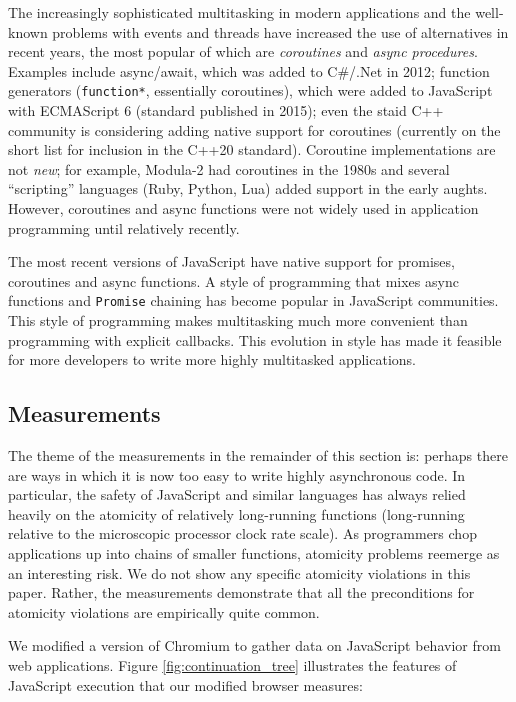\documentclass[acmsmall,anonymous,review]{acmart}\settopmatter{printfolios=true,printccs=false,printacmref=false}
\begin{document}
The increasingly sophisticated multitasking in modern applications and the well-known problems with events and threads have increased the use of alternatives in recent years, the most popular of which are \emph{coroutines} and \emph{async procedures}.
Examples include async/await, which was added to C\#/.Net in 2012; function generators (\texttt{function*}, essentially coroutines), which were added to JavaScript with ECMAScript 6 (standard published in 2015); even the staid C++ community is considering adding native support for coroutines (currently on the short list for inclusion in the C++20 standard).
Coroutine implementations are not \emph{new}; for example, Modula-2 had coroutines in the 1980s and several ``scripting'' languages (Ruby, Python, Lua) added support in the early aughts.
However, coroutines and async functions were not widely used in application programming until relatively recently.

The most recent versions of JavaScript have native support for promises, coroutines and async functions.
A style of programming that mixes async functions and \texttt{Promise} chaining has become popular in JavaScript communities.
This style of programming makes multitasking much more convenient than programming with explicit callbacks.
This evolution in style has made it feasible for more developers to write more highly multitasked applications.

\subsection{Measurements}

The theme of the measurements in the remainder of this section is: perhaps there are ways in which it is now too easy to write highly asynchronous code.
In particular, the safety of JavaScript and similar languages has always relied heavily on the atomicity of relatively long-running functions (long-running relative to the microscopic processor clock rate scale).
As programmers chop applications up into chains of smaller functions, atomicity problems reemerge as an interesting risk.
We do not show any specific atomicity violations in this paper.
Rather, the measurements demonstrate that all the preconditions for atomicity violations are empirically quite common.

We modified a version of Chromium to gather data on JavaScript behavior from web applications.
Figure \ref{fig:continuation_tree} illustrates the features of JavaScript execution that our modified browser measures:
\end{document}
